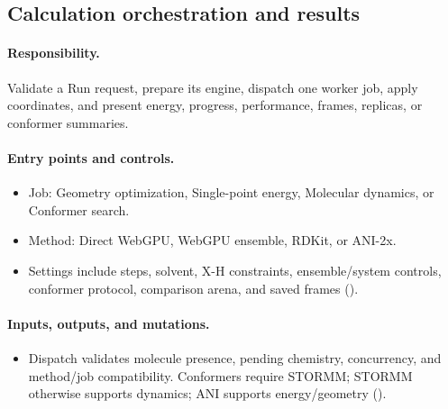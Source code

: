 \documentclass[11pt]{article}
\begin{document}
\begin{small}
\begin{itemize}[leftmargin=*]
\end{itemize}

\subsection{Calculation orchestration and results}\label{appB:sec16}

\paragraph{Responsibility.}

Validate a Run request, prepare its engine, dispatch one worker job, apply coordinates, and present energy, progress, performance, frames, replicas, or conformer summaries.

\paragraph{Entry points and controls.}

\begin{itemize}[leftmargin=*]

\item Job: Geometry optimization, Single-point energy, Molecular dynamics, or Conformer search.

\item Method: Direct WebGPU, WebGPU ensemble, RDKit, or ANI-2x.

\end{itemize}

\begin{itemize}[leftmargin=*]

\item Settings include steps, solvent, X-H constraints, ensemble/system controls, conformer protocol, comparison arena, and saved frames ().

\end{itemize}

\paragraph{Inputs, outputs, and mutations.}

\begin{itemize}[leftmargin=*]

\item Dispatch validates molecule presence, pending chemistry, concurrency, and method/job compatibility. Conformers require STORMM; STORMM otherwise supports dynamics; ANI supports energy/geometry ().


\end{itemize}
\end{small}
\end{document}
